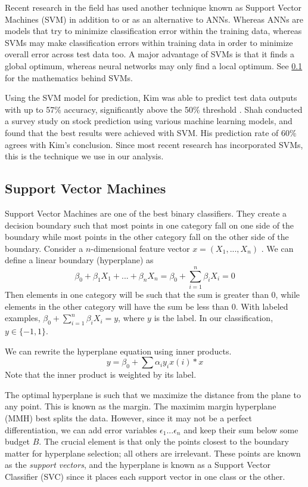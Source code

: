 \documentclass[pageno]{jpaper}
\begin{document}
Recent research in the field has used another technique known as Support Vector Machines (SVM) in addition to or as an alternative to ANNs. Whereas ANNs are models that try to minimize classification error within the training data, whereas SVMs may make classification errors within training data in order to minimize overall error across test data too. A major advantage of SVMs is that it finds a global optimum, whereas neural networks may only find a local optimum. See \ref{subsec: svm} for the mathematics behind SVMs.

Using the SVM model for prediction, Kim was able to predict test data outputs with up to 57\% accuracy, significantly above the 50\% threshold \cite{kim}. Shah conducted a survey study on stock prediction using various machine learning models, and found that the best results were achieved with SVM\cite{shah}. His prediction rate of 60\% agrees with Kim's conclusion. Since most recent research has incorporated SVMs, this is the technique we use in our analysis.

\subsection{Support Vector Machines}
\label{subsec: svm}

Support Vector Machines are one of the best binary classifiers. They create a decision boundary such that most points in one category fall on one side of the boundary while most points in the other category fall on the other side of the boundary. Consider a $n$-dimensional feature vector $x = (X_1, ..., X_n)$ \cite{halls-moore}. We can define a linear boundary (hyperplane) as 
$$\beta_0+\beta_1X_1+...+\beta_nX_n=\beta_0+\sum_{i=1}^n\beta_iX_i = 0$$
Then elements in one category will be such that the sum is greater than 0, while elements in the other category will have the sum be less than 0. With labeled examples, $\beta_0+\sum_{i=1}^n\beta_iX_i = y$, where $y$ is the label. In our classification, $y \in \{-1, 1\}$.

We can rewrite the hyperplane equation using inner products.
$$y = \beta_0 + \sum \alpha_iy_ix(i)*x$$
Note that the inner product is weighted by its label. 

The optimal hyperplane is such that we maximize the distance from the plane to any point. This is known as the margin. The maximim margin hyperplane (MMH) best splits the data. However, since it may not be a perfect differentiation, we can add error variables $\epsilon_1 ... \epsilon_n$ and keep their sum below some budget $B$. The crucial element is that only the points closest to the boundary matter for hyperplane selection; all others are irrelevant. These points are known as the {\em support vectors}, and the hyperplane is known as a Support Vector Classifier (SVC) since it places each support vector in one class or the other.
\end{document}
